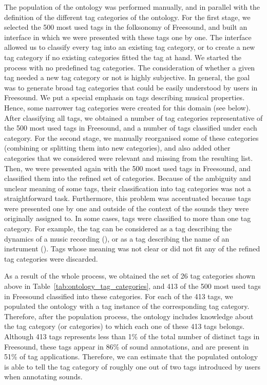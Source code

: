 The population of the ontology was performed manually, and in parallel with the definition of the different tag categories of the ontology.
For the first stage, we selected the 500 most used tags in the folksonomy of Freesound, and built an interface in which we were presented with these tags one by one.
The interface allowed us to classify every tag into an existing tag category, or to create a new tag category if no existing categories fitted the tag at hand.
We started the process with no predefined tag categories.
The consideration of whether a given tag needed a new tag category or not is highly subjective. In general, the goal was to generate broad tag categories that could be easily understood by users in Freesound. We put a special emphasis on tags describing musical properties. Hence, some narrower tag categories were created for this domain (see below).  
After classifying all tags, we obtained a number of tag categories representative of the 500 most used tags in Freesound, and a number of tags classified under each category.
For the second stage, we manually reorganised some of these categories (combining or splitting them into new categories), and also added other categories that we considered were relevant and missing from the resulting list. 
Then, we were presented again with the 500 most used tags in Freesound, and classified them into the refined set of categories. 
Because of the ambiguity and unclear meaning of some tags, their classification into tag categories was not a straightforward task.
Furthermore, this problem was accentuated because tags were presented one by one and outside of the context of the sounds they were originally assigned to.
In some cases, tags were classified to more than one tag category. For example, the tag  can be considered as a tag describing the dynamics of a music recording (), or as a tag describing the name of an instrument (). Tags whose meaning was not clear or did not fit any of the refined tag categories were discarded.

As a result of the whole process, we obtained the set of 26 tag categories shown above in Table~\ref{tab:ontology_tag_categories}, and 413 of the 500 most used tags in Freesound classified into these categories. 
For each of the 413 tags, we populated the ontology with a tag instance of the corresponding tag category.
Therefore, after the population process, the ontology includes knowledge about the tag category (or categories) to which each one of these 413 tags belongs.
Although 413 tags represents less than 1\% of the total number of distinct tags in Freesound, these tags appear in 86\% of sound annotations, and are present in 51\% of tag applications. Therefore, we can estimate that the populated ontology is able to tell the tag category of roughly one out of two tags introduced by users when annotating sounds.

